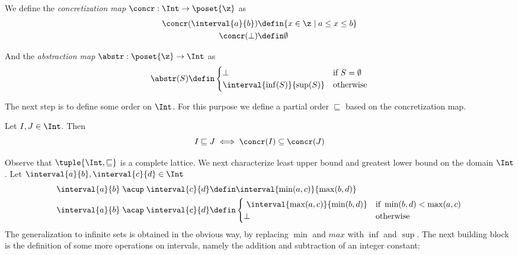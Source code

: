 \begin{definition}\label{def:concrint}
  We define the \emph{concretization map} \(\concr : \Int \to
  \poset{\z}\) as
  \begin{align*}
    \concr(\interval{a}{b}) & \defin \{x\in \z \mid a \leq x \leq b\} \\
    \concr(\bot) & \defin \emptyset
  \end{align*}

  And the \emph{abstraction map} \(\abstr:\poset{\z} \to \Int\) as
  \begin{equation*}
    \abstr(S) \defin
    \begin{cases}
      \bot & \text{if } S = \emptyset \\
      \interval{\inf(S)}{\sup(S)} & \text{otherwise}
    \end{cases}
  \end{equation*}
\end{definition}
The next step is to define some order on \(\Int\). For this purpose
we define a partial order \(\sqsubseteq\) based on the concretization
map.
\begin{definition}\label{def:intpo}
  Let \(I,J \in \Int\). Then
  \begin{equation*}
    I \sqsubseteq J \iff \concr(I) \subseteq \concr(J)
  \end{equation*}
\end{definition}
Observe that \(\tuple{\Int,\sqsubseteq}\) is a complete lattice. We
next characterize least upper bound and greatest lower bound on the
domain \(\Int\). Let \({\interval{a}{b}, \interval{c}{d}\in \Int}\)
\begin{align*}
  \interval{a}{b} \; \acup \; \interval{c}{d} & \defin \interval{\min(a,c)}{\max(b,d)} \\
  \interval{a}{b} \; \acap \; \interval{c}{d} & \defin
                                                \begin{cases} \
                                                  \interval{\max(a,c)}{\min(b,d)} & \text{if } \min(b,d) < \max(a,c) \\
                                                  \bot & \text{otherwise}
                                                \end{cases}
\end{align*}
The generalization to infinite sets is obtained in the obvious way, by
replacing \(\min\) and \(max\) with \(\inf\) and \(\sup\).
\noindent
The next building block is the definition of some more operations on
intervals, namely the addition and subtraction of an integer constant:

